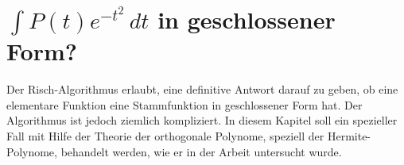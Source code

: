 %
%
%
\chapter{$\int P(t) e^{-t^2} \,dt$ in geschlossener Form?
\label{chapter:dreieck}}
\begin{refsection}

\noindent
Der Risch-Algorithmus erlaubt, eine definitive Antwort darauf zu geben,
%
%
ob eine elementare Funktion eine Stammfunktion in geschlossener Form hat.
Der Algorithmus ist jedoch ziemlich kompliziert.
In diesem Kapitel soll ein spezieller Fall mit Hilfe der Theorie der
orthogonale Polynome, speziell der Hermite-Polynome, behandelt werden,
wie er in der Arbeit \cite{dreieck:polint} untersucht wurde.






\printbibliography[heading=subbibliography]
\end{refsection}
